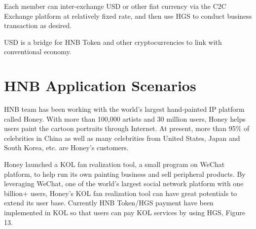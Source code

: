 \documentclass[fleqn,10pt]{SelfArx} %
\begin{document}


Each member can inter-exchange USD or other fiat currency via the C2C Exchange platform at relatively fixed rate, and then use HGS to conduct business transaction as desired. \\


USD is a bridge for HNB Token and other cryptocurrencies to link with conventional economy. \\


\section{HNB Application Scenarios}



HNB team has been working with the world’s largest hand-painted IP platform called Honey. With more than 100,000 artists and 30 million users, Honey helps users paint the cartoon portraits through Internet. At present, more than 95\% of celebrities in China as well as many celebrities from United States, Japan and South Korea, etc. are Honey’s customers.

Honey launched a KOL fan realization tool, a small program on WeChat platform, to help run its own painting business and sell peripheral products. By leveraging WeChat, one of the world’s largest social network platform with one billion+ users, Honey’s KOL fan realization tool can have great potentials to extend its user base. Currently HNB Token/HGS payment have been implemented in KOL so that users can pay KOL services by using HGS, Figure 13.
\end{document}
